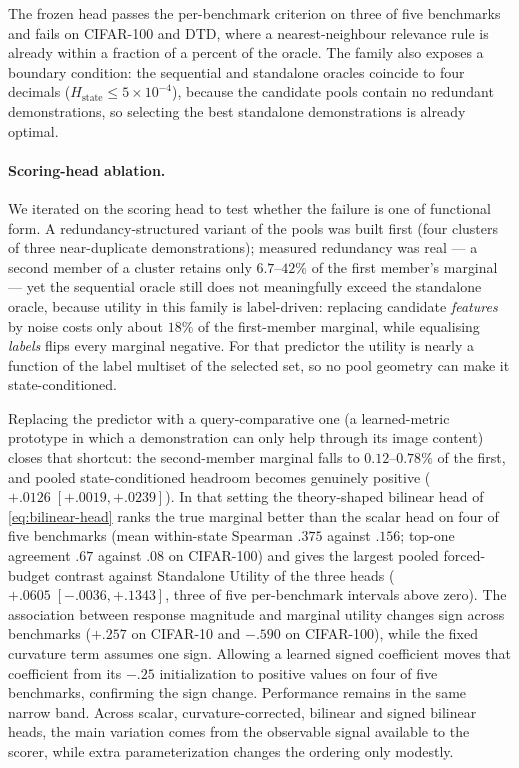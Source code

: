 The frozen head passes the per-benchmark criterion on three of five benchmarks
and fails on CIFAR-100 and DTD, where a nearest-neighbour relevance rule is
already within a fraction of a percent of the oracle. The family also exposes
a boundary condition: the sequential and standalone oracles coincide to four
decimals ($H_{\mathrm{state}}\le 5\times10^{-4}$), because the candidate pools
contain no redundant demonstrations, so selecting the best standalone
demonstrations is already optimal.

\paragraph{Scoring-head ablation.} We iterated on the scoring head to test
whether the failure is one of functional form. A redundancy-structured variant
of the pools was built first (four clusters of three near-duplicate
demonstrations); measured redundancy was real --- a second member of a cluster
retains only $6.7$--$42\%$ of the first member's marginal --- yet the
sequential oracle still does not meaningfully exceed the standalone oracle,
because utility in this family is label-driven: replacing candidate
\emph{features} by noise costs only about $18\%$ of the first-member marginal,
while equalising \emph{labels} flips every marginal negative. For that
predictor the utility is nearly a function of the label multiset of the
selected set, so no pool geometry can make it state-conditioned.

Replacing the predictor with a query-comparative one (a learned-metric
prototype in which a demonstration can only help through its image content)
closes that shortcut: the second-member marginal falls to $0.12$--$0.78\%$ of
the first, and pooled state-conditioned headroom becomes genuinely positive
($+.0126\;[+.0019,+.0239]$). In that setting the theory-shaped bilinear head of
\cref{eq:bilinear-head} ranks the true marginal better than the scalar head on
four of five benchmarks (mean within-state Spearman $.375$ against $.156$;
top-one agreement $.67$ against $.08$ on CIFAR-100) and gives the largest pooled
forced-budget contrast against Standalone Utility of the three heads
($+.0605\;[-.0036,+.1343]$, three of five per-benchmark intervals above zero).
The association between response magnitude and marginal utility changes sign
across benchmarks ($+.257$ on CIFAR-10 and $-.590$ on CIFAR-100), while the
fixed curvature term assumes one sign. Allowing a learned signed coefficient
moves that coefficient from its $-.25$ initialization to positive values on
four of five benchmarks, confirming the sign change. Performance remains in the
same narrow band. Across scalar, curvature-corrected, bilinear and signed
bilinear heads, the main variation comes from the observable signal available
to the scorer, while extra parameterization changes the ordering only modestly.


